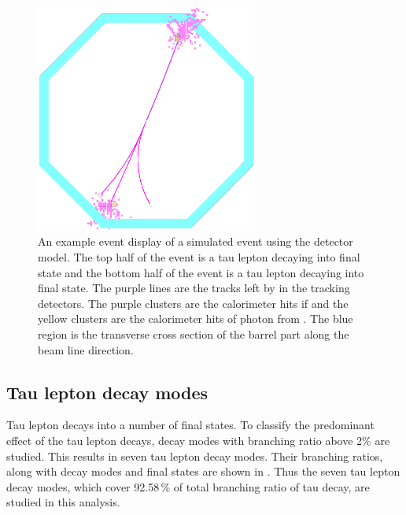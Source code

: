 \begin{figure}[tbph]
\centering
\includegraphics[width=0.65\textwidth]{tau/tau_evt_dsp2}
\caption{ An example event display of a simulated \eeToTauTau event using the \ILD detector model. The top half of the event is a tau lepton decaying into \decayRhoFinalStateShort final state and the bottom half of the event is a tau lepton decaying into  \decayThreePionPhotonShort final state. The purple lines are the tracks left by \Ppipm in the tracking detectors. The purple clusters are the calorimeter hits if \Ppipm and the yellow clusters are the calorimeter hits of photon from \HepProcess{\Ppizero \to \Pphoton \Pphoton}. The blue region is the transverse cross section of the \ECAL barrel part along the beam line direction.}
\label{fig:tauEvtDsp}
\end{figure}

\subsection{Tau lepton decay modes}

Tau lepton decays into a number of final states. To classify the predominant effect of the tau lepton decays, decay modes with branching ratio above 2\% are studied. This results in seven tau lepton decay modes. Their branching ratios, along with decay modes and final states are  shown in . Thus the seven tau lepton decay modes, which cover 92.58\,\% of total branching ratio of tau decay, are studied in this analysis.


